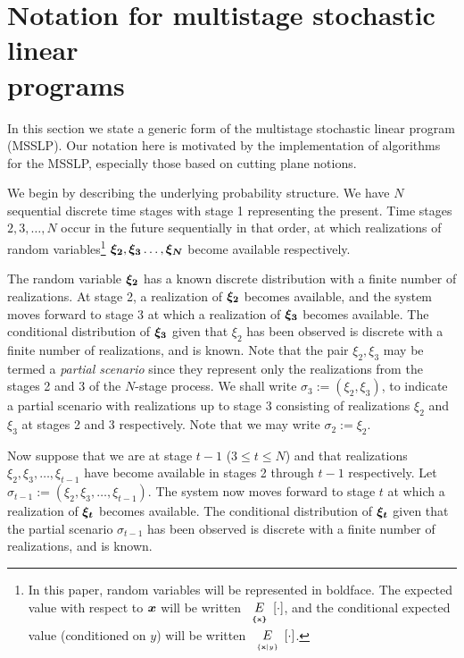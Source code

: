 \section{Notation for multistage stochastic linear\\ programs}
\label{SEC:problem-statement}
In this section we state a generic form of the multistage
stochastic linear program (MSSLP). Our notation here
is motivated by the implementation of algorithms for the
MSSLP, especially those based on cutting plane notions.
\par
We begin by describing the underlying probability structure.
We have $N$ sequential discrete time stages with stage 1
representing the present.
Time stages $2, 3, \ldots, N$ occur in the future sequentially
in that order, at which
realizations of random variables\footnote{In this paper, random variables will be represented in boldface.  The expected value with respect to $\mathbf{\boldsymbol{x}}$ will be written $\expect[\{ \mathbf{x}\}][\cdot]$, and the conditional expected value (conditioned on $y$) will be written $                {\setlength{\extrarowheight}{-6pt}
                        \begin{array}[t]{c}
                                E \\ {\scriptscriptstyle \{\mathbf{x}|y\} }
                        \end{array}
                }[\cdot]$.}
 $\mathbf{\boldsymbol{\xi _2}}, \mathbf{\boldsymbol{\xi _3}}
\ldots, \mathbf{\boldsymbol{\xi _N}}$ become available respectively.
\par
The random variable $\mathbf{\boldsymbol{\xi_2}}$ has a known discrete
distribution with a finite
number of realizations.
At stage 2, a realization of $\mathbf{\boldsymbol{\xi_2}}$
becomes available, and the system moves forward to stage 3
at which a realization of $\mathbf{\boldsymbol{\xi _3}}$ becomes available.
The
conditional distribution of $\mathbf{\boldsymbol{\xi_3}}$ given that
$\xi _2$ has been observed is discrete with a finite
number of realizations, and is known.
 Note that the pair $\xi_2, \xi_3$
may be termed a {\em partial scenario} since they represent only
the realizations from the stages 2 and 3 of the $N$-stage process.
We shall write $\sigma_3:= (\xi_2, \xi_3)$,
to indicate a partial
scenario with realizations up to stage 3
consisting of realizations $\xi_2$
and $\xi_3$ at stages 2 and 3 respectively.
Note that we may write
$\sigma_2:= \xi_2$.
\par
Now suppose that we are at stage $t-1$ ($3\leq t\leq N$)
and that realizations
$\xi_2, \xi_3, \ldots, \xi_{t-1}$ have become
available in stages 2 through $t-1$ respectively. 
Let $\sigma_{t-1} :=(\xi_2, \xi_3, \ldots, \xi_{t-1})$.
The system now moves forward
to stage $t$ at which a realization of $\mathbf{\boldsymbol{\xi_{t}}}$
becomes available.  The conditional distribution
of $\mathbf{\boldsymbol{\xi_{t}}}$ given that the partial scenario $\sigma_{t-1}$ has been
observed is discrete with a finite number of realizations, and
is known.

